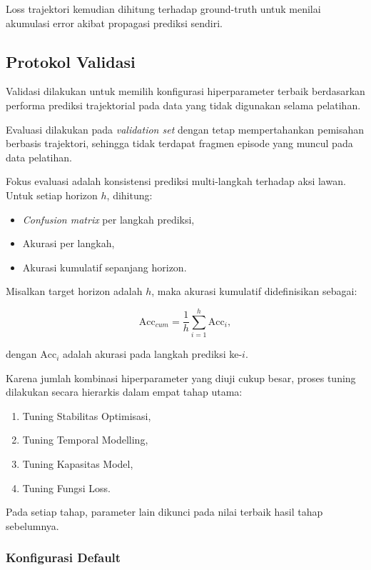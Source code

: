 Loss trajektori kemudian dihitung terhadap ground-truth untuk menilai akumulasi error akibat propagasi prediksi sendiri.

\subsection{Protokol Validasi}

Validasi dilakukan untuk memilih konfigurasi hiperparameter terbaik berdasarkan performa prediksi trajektorial pada data yang tidak digunakan selama pelatihan. 

Evaluasi dilakukan pada \textit{validation set} dengan tetap mempertahankan pemisahan berbasis trajektori, sehingga tidak terdapat fragmen episode yang muncul pada data pelatihan.

Fokus evaluasi adalah konsistensi prediksi multi-langkah terhadap aksi lawan. Untuk setiap horizon $h$, dihitung:

\begin{itemize}
    \item \textit{Confusion matrix} per langkah prediksi,
    \item Akurasi per langkah,
    \item Akurasi kumulatif sepanjang horizon.
\end{itemize}

Misalkan target horizon adalah $h$, maka akurasi kumulatif didefinisikan sebagai:

\[
\text{Acc}_{cum} = 
\frac{1}{h}
\sum_{i=1}^{h}
\text{Acc}_i,
\]

dengan $\text{Acc}_i$ adalah akurasi pada langkah prediksi ke-$i$.

Karena jumlah kombinasi hiperparameter yang diuji cukup besar, proses tuning dilakukan secara hierarkis dalam empat tahap utama:

\begin{enumerate}
    \item Tuning Stabilitas Optimisasi,
    \item Tuning Temporal Modelling,
    \item Tuning Kapasitas Model,
    \item Tuning Fungsi Loss.
\end{enumerate}

Pada setiap tahap, parameter lain dikunci pada nilai terbaik hasil tahap sebelumnya.

\subsubsection{Konfigurasi Default}

